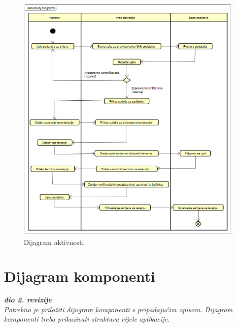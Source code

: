             \begin{figure}[H]
             \centering
             \includegraphics[width=1\linewidth]{slike/dijagramAktivnosti.png}
             \caption{Dijagram aktivnosti}
             \end{figure}
			\eject

		\section{Dijagram komponenti}
		
			\textbf{\textit{dio 2. revizije}}\\
		
			 \textit{Potrebno je priložiti dijagram komponenti s pripadajućim opisom. Dijagram komponenti treba prikazivati strukturu cijele aplikacije.}